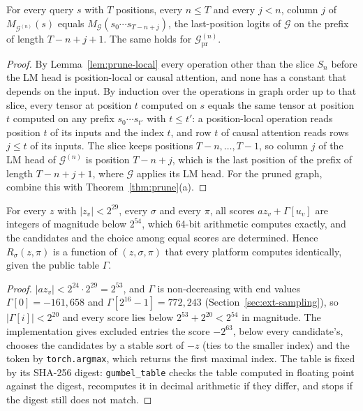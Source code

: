 \begin{lemma}
\label{lem:causal}
For every query $s$ with $T$ positions, every $n\le T$ and every $j<n$, column $j$ of
$M_{\mathcal G^{(n)}}(s)$ equals $M_{\mathcal G}(s_0\cdots s_{T-n+j})$, the last-position logits
of $\mathcal G$ on the prefix of length $T-n+j+1$. The same holds for
$\mathcal G^{(n)}_{\mathrm{pr}}$.
\end{lemma}

\begin{proof}
By Lemma~\ref{lem:prune-local} every operation other than the slice $S_n$ before the LM head is
position-local or causal attention, and none has a constant that depends on the input. By induction
over the operations in graph order up to that slice, every tensor at position $t$ computed on $s$
equals the same tensor at position $t$ computed on any prefix
$s_0\cdots s_{t'}$ with $t\le t'$: a position-local operation reads position $t$ of its inputs and
the index $t$, and row $t$ of causal attention reads rows $j\le t$ of its inputs. The slice keeps
positions $T-n,\dots,T-1$, so column $j$ of the LM head of $\mathcal G^{(n)}$ is position $T-n+j$, which is the last position of the prefix of
length $T-n+j+1$, where $\mathcal G$ applies its LM head. For the pruned graph, combine this with
Theorem~\ref{thm:prune}(a).
\end{proof}

\begin{lemma}
\label{lem:sampler}
For every $z$ with $|z_v|<2^{29}$, every $\sigma$ and every $\pi$, all scores $az_v+\Gamma[u_v]$
are integers of magnitude below $2^{54}$, which 64-bit arithmetic computes exactly, and the
candidates and the choice among equal scores are determined. Hence $R_\sigma(z,\pi)$ is a function
of $(z,\sigma,\pi)$ that every platform computes identically, given the public table $\Gamma$.
\end{lemma}

\begin{proof}
$|az_v|<2^{24}\cdot2^{29}=2^{53}$, and $\Gamma$ is non-decreasing with end values
$\Gamma[0]=-161{,}658$ and $\Gamma[2^{16}-1]=772{,}243$ (Section~\ref{sec:ext-sampling}), so
$|\Gamma[i]|<2^{20}$ and every score lies below $2^{53}+2^{20}<2^{54}$ in magnitude. The
implementation gives excluded entries the score $-2^{63}$, below every candidate's, chooses the
candidates by a stable sort of $-z$ (ties to the smaller index) and the token by
\texttt{torch.argmax}, which returns the first maximal index. The table is fixed by its SHA-256
digest: \texttt{gumbel\_table} checks the table computed in floating point against the digest,
recomputes it in decimal arithmetic if they differ, and stops if the digest still does not match.
\end{proof}

